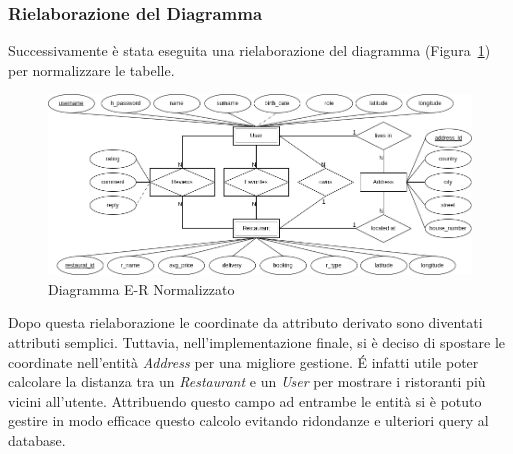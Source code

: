 \subsubsection{Rielaborazione del Diagramma}
Successivamente è stata eseguita una rielaborazione del diagramma 
(Figura~\ref{fig:er-diagram2})
per normalizzare le tabelle.
\begin{figure}[H]
  \centering
  \includegraphics[width=\textwidth]{images/ER-refactored.png}
  \caption{Diagramma E-R Normalizzato}
  \label{fig:er-diagram2}
\end{figure}
Dopo questa rielaborazione le coordinate da attributo derivato 
sono diventati attributi semplici.
Tuttavia, nell'implementazione finale, si è deciso di spostare le 
coordinate nell'entità \textit{Address} per una migliore gestione.
\'E infatti utile poter calcolare la distanza tra un \textit{Restaurant} 
e un \textit{User} per mostrare i ristoranti più vicini all'utente.
Attribuendo questo campo ad entrambe le entità si è potuto gestire 
in modo efficace questo calcolo evitando ridondanze e ulteriori 
query al database.

